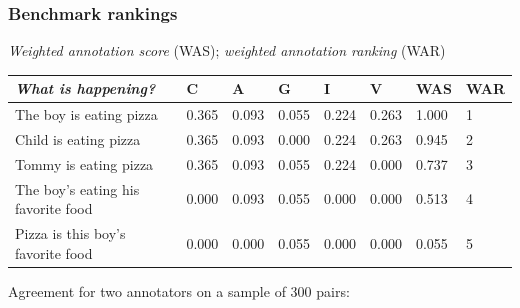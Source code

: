 \documentclass[handout,xcolor={dvipsnames}]{beamer}
\begin{document}
\begin{frame}
\frametitle{Benchmark rankings}
\small


\vspace{.8em}
\textit{Weighted annotation score} (WAS); \textit{weighted annotation ranking} (WAR) \\
\begin{footnotesize}
\vspace{-.5em}
\begin{table}[htb!]
\begin{center}
\begin{tabular}{|p{2.7cm}||p{.7cm}|p{.7cm}|p{.7cm}|p{.7cm}|p{.7cm}|p{.7cm}|p{.6cm}|}
\hline
\textit{What is happening?} & C & A & G & I & V & WAS & WAR \\
\hline
\hline
The boy is eating pizza & 0.365 & 0.093 & 0.055 & 0.224 & 0.263 & 1.000 & 1 \\
\hline
Child is eating pizza & 0.365 & 0.093 & 0.000 & 0.224 & 0.263 & 0.945 & 2 \\
\hline
Tommy is eating pizza & 0.365 & 0.093 & 0.055 & 0.224 & 0.000 & 0.737 & 3 \\
\hline
The boy's eating his favorite food & 0.000 & 0.093 & 0.055 & 0.000 & 0.000 & 0.513 & 4 \\
\hline
Pizza is this boy's favorite food & 0.000 & 0.000 & 0.055 & 0.000 & 0.000 & 0.055 & 5 \\
\hline
\end{tabular}
\end{center}
\end{table}
\end{footnotesize}

\vspace{1em}

\pause
Agreement for two annotators on a sample of 300 pairs: \\


\end{frame}
\end{document}
